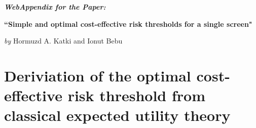 \documentclass[AMA,STIX1COL]{WileyNJD-v2}
\begin{document}

\begin{center}
\Large\emph{\textbf{WebAppendix for the Paper: }}

\vspace{3mm}
\textbf{``Simple and optimal cost-effective risk thresholds for a single screen"}

\vspace{3mm}
\emph{by} Hormuzd A. Katki and Ionut Bebu
\end{center}


%

\setcounter{section}{0}
\renewcommand*{\theHsection}{chX.\the\value{section}}


\section{Deriviation of the optimal cost-effective risk threshold from classical expected utility theory}
\label{sec:derivethreshold}
\end{document}

